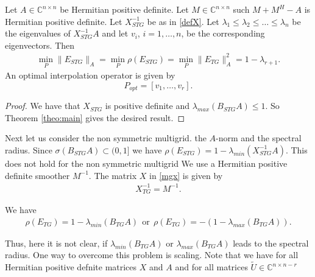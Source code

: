 \documentclass[final]{amsart}
\newcommand{\beqo}{\begin{eqnarray*}}
\newcommand{\beq}{\begin{eqnarray}}
\newcommand{\eeqo}{\end{eqnarray*}}
\newcommand{\eeq}{\end{eqnarray}}
\numberwithin{equation}{section}
\newcommand{\Cnnr}{\mathbb{C}^{n \times n-r}}
\newcommand{\inCnn}{\in \mathbb{C}^{n \times n}}
\begin{document}
\begin{corollary} \label{coro:one}
Let  $A\inCnn$  be Hermitian positive definite. Let $ M \inCnn$ such $M + M^H -
A$ is Hermitian positive definite.
Let $X_{STG}^{-1}$  be as in \eqref{defX}.  
 Let $
\lambda_1 \leq \lambda_2 \leq \ldots \leq  \lambda_n $
be the  eigenvalues of $X_{STG}^{-1}A$  and let $v_i$, $i = 1, \ldots, n$, be
the corresponding eigenvectors. Then
\beq
\min_{P} \|E_{STG}\|_A = \min_{P}\rho(E_{STG}) =  \min_{P}\|E_{TG}\|_A^2 = 1 -
\lambda_{r+1}.
\eeq
An optimal interpolation operator is given by 
\[
P_{opt} = [v_{1}, \ldots , v_r].
\]
\end{corollary}
\begin{proof}
We have  that $X_{STG}$ is positive definite and $\lambda_{max}(B_{STG}A) \leq
1$. So Theorem \ref{theo:main} gives the desired result.
\end{proof}

Next  let us consider  the non symmetric  multigrid. 
the $A$-norm and the spectral radius. Since $\sigma(B_{STG}A) \subset (0,1]$
we have   $\rho(E_{STG}) = 1 - \lambda_{min}(X_{STG}^{-1}A)$. This does not
hold for the non symmetric multigrid
We use a Hermitian positive  definite smoother $M^{-1}$. The matrix $X$ in
\eqref{mgx} is given by
\beq \label{defXtg}
X^{-1}_{TG} = M^{-1}.
\eeq

We have
\beqo
\rho(E_{TG}) = 1 - \lambda_{min}(B_{TG}A)
\ \  \mbox{or} \ \ 
\rho(E_{TG}) = -(1 - \lambda_{max}(B_{TG}A)).
\eeqo

Thus, here it is not clear, if $\lambda_{min}(B_{TG}A)$ or
$\lambda_{max}(B_{TG}A)$  leads to the spectral radius.
One way to overcome  this problem is scaling. Note that we  have for all
Hermitian positive defnite matrices $X$ and $A$ and for all matrices $\tilde U
\in \Cnnr$
\end{document}
